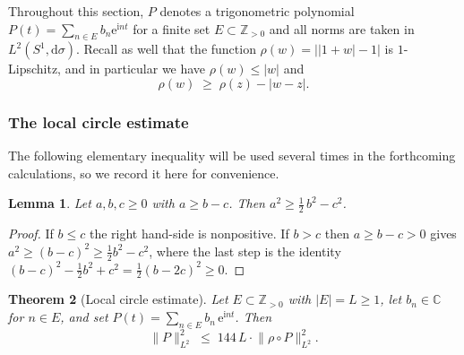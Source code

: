 \documentclass[11pt]{amsart}
\newtheorem{theorem}{Theorem}[section]
\newtheorem{lemma}[theorem]{Lemma}
\theoremstyle{remark}
\begin{document}
Throughout this section, $P$ denotes a trigonometric polynomial
$P(t) = \sum_{n \in E} b_n \mathrm{e}^{\mathrm{i} nt}$ for a finite set $E \subset \mathbb{Z}_{>0}$ 
and all norms are taken in $L^2(S^1, \mathrm{d}\sigma)$. Recall as well that the function $\rho(w) = \bigl\lvert \lvert 1+w \rvert - 1 \bigr\rvert$
 is $1$-Lipschitz, and in particular we have $\rho(w) \le \lvert w \rvert$ and
\begin{equation}\label{eq:rho-lip}
\rho(w) \;\ge\; \rho(z) - \lvert w - z \rvert.
\end{equation}

\subsubsection{The local circle estimate}\label{sec:local}

The following elementary inequality will be  used several times in the forthcoming calculations, so we record it here for convenience.

\begin{lemma}\label{lem:safe-square}
Let $a, b, c \ge 0$ with $a \ge b - c$.  Then
$a^2 \ge \tfrac{1}{2}\, b^2 - c^2$.
\end{lemma}

\begin{proof}
If $b \le c$ the right hand-side is nonpositive.  If $b > c$ then
$a \ge b-c > 0$ gives $a^2 \ge (b-c)^2 \ge \tfrac{1}{2}b^2 - c^2$, where
the last step is the identity
$(b-c)^2 - \tfrac{1}{2}b^2 + c^2 = \tfrac{1}{2}(b-2c)^2 \ge 0$.
\end{proof}

\begin{theorem}[Local circle estimate]\label{thm:local-circle} Let $E \subset \mathbb{Z}_{>0}$ with $\lvert E \rvert = L \ge 1$, let $b_n \in \mathbb{C}$ for
$n \in E$, and set $P(t) = \sum_{n \in E} b_n\,\mathrm{e}^{\mathrm{i} nt}$.  Then
\[
\lVert P \rVert_{L^2}^2
\;\le\;
144\, L \cdot \lVert \rho \circ P \rVert_{L^2}^2.
\]
\end{theorem}
\end{document}
